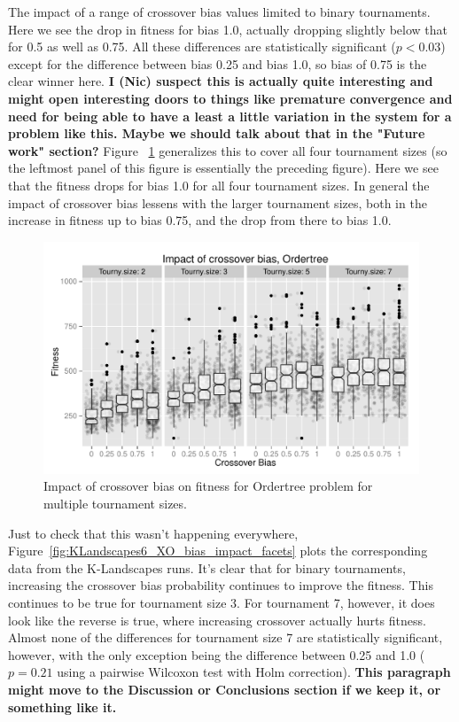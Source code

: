 \documentclass{sig-alternate}
\begin{document}
The impact of a range of crossover bias values 
limited to binary tournaments. Here we see the drop in fitness for bias 1.0, actually dropping slightly below that for 0.5 
as well as 0.75. All these differences are statistically significant ($p < 0.03$) except for the difference between bias 
0.25 and bias 1.0, so bias of 0.75 is the clear winner here. \textbf{I (Nic) suspect this is actually quite interesting and 
might open interesting doors to things like premature convergence and need for being able to have a least a little 
variation in the system for a problem like this. Maybe we should talk about that in the "Future work" section?} Figure~
\ref{fig:Ordertree_results_all_tournaments_Jan15} generalizes this to cover all four tournament sizes (so the leftmost 
panel of this figure is essentially the preceding figure). Here we see that the fitness drops for bias 1.0 for all four 
tournament sizes. In general the impact of crossover bias lessens with the larger tournament sizes, both in the 
increase in fitness up to bias 0.75, and the drop from there to bias 1.0.

\begin{figure}
\centering
\includegraphics[width=0.45 \textwidth]{Plots/Ordertree_results_all_tournaments_Jan15.pdf}
\caption{Impact of crossover bias on fitness for Ordertree problem for multiple tournament sizes.}
\label{fig:Ordertree_results_all_tournaments_Jan15}
\end{figure}

Just to check that this wasn't happening everywhere, Figure~\ref{fig:KLandscapes6_XO_bias_impact_facets} plots 
the corresponding data from the K-Landscapes runs. It's clear that for binary tournaments, increasing the crossover 
bias probability continues to improve the fitness. This continues to be true for tournament size 3. For tournament 7, 
however, it does look like the reverse is true, where increasing crossover actually hurts fitness. Almost none of the 
differences for tournament size 7 are statistically significant, however, with the only exception being the difference 
between 0.25 and 1.0 ($p=0.21$ using a pairwise Wilcoxon test with Holm correction). \textbf{This paragraph might 
move to the Discussion or Conclusions section if we keep it, or something like it.}
\end{document}
